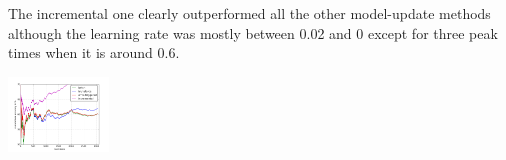 The incremental one clearly outperformed all the other model-update methods although the learning rate was mostly between 0.02 and 0 except for three peak times when it is around 0.6.

   \includegraphics[width=0.2\textwidth]{./plots/allAccuracies}\\

